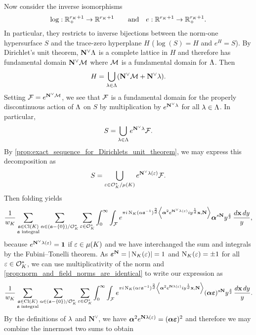       Now consider the inverse isomorphisms
      \[
        \log:\mathbb{R}_{+}^{r_{K}+1} \to \mathbb{R}^{r_{K}+1} \qquad \text{and} \quad e:\mathbb{R}^{r_{K}+1} \to \mathbb{R}_{+}^{r_{K}+1}.
      \]
      In particular, they restricts to inverse bijections between the norm-one hypersurface $S$ and the trace-zero hyperplane $H$ ($\log(S) = H$ and $e^{H} = S$). By Dirichlet's unit theorem, $\mathbf{N}^{\vee}\Lambda$ is a complete lattice in $H$ and therefore has fundamental domain $\mathbf{N}^{\vee}\mathcal{M}$ where $\mathcal{M}$ is a fundamental domain for $\Lambda$. Then
      \[
        H = \bigcup_{\lambda \in \Lambda}(\mathbf{N}^{\vee}\mathcal{M}+\mathbf{N}^{\vee}\lambda).
      \]
      Setting $\mathcal{F} = e^{\mathbf{N}^{\vee}\mathcal{M}}$, we see that $\mathcal{F}$ is a fundamental domain for the properly discontinuous action of $\Lambda$ on $S$ by multiplication by $e^{\mathbf{N}^{\vee}\lambda}$ for all $\lambda \in \Lambda$. In particular,
      \[
        S = \bigcup_{\lambda \in \Lambda}e^{\mathbf{N}^{\vee}\lambda}\mathcal{F}.
      \]
      By \cref{prop:exact_sequence_for_Dirichlets_unit_theorem}, we may express this decomposition as
      \[
        S = \bigcup_{\varepsilon \in \mathcal{O}_{K}^{\ast}/\mu(K)}e^{\mathbf{N}^{\vee}\lambda(\varepsilon)}\mathcal{F}.
      \]
      Then folding yields
      \[
        \frac{1}{w_{K}}\sum_{\substack{\mathfrak{a} \in \operatorname{\mathrm{Cl}}(K) \\ \text{$\mathfrak{a}$ integral}}}\sum_{\alpha \in (\mathfrak{a}-\{0\})/\mathcal{O}_{K}^{\ast}}\sum_{\varepsilon \in \mathcal{O}_{K}^{\ast}}\int_{0}^{\infty}\int_{\mathcal{F}}e^{\pi i\operatorname{\mathrm{N}}_{K}(\alpha\mathfrak{a}^{-1})^{\frac{2}{d}}\left\langle\boldsymbol{\alpha}^{2}e^{\mathbf{N}^{\vee}\lambda(\varepsilon)}iy^{\frac{1}{d}}\mathbf{x},\mathbf{N}\right\rangle}\boldsymbol{\alpha}^{s\mathbf{N}}y^{\frac{s}{2}}\,\frac{d\mathbf{x}\,dy}{y},
      \]
      because $e^{\mathbf{N}^{\vee}\lambda(\varepsilon)} = \mathbf{1}$ if $\varepsilon \in \mu(K)$ and we have interchanged the sum and integrals by the Fubini–Tonelli theorem. As $\boldsymbol{\varepsilon}^{\mathbf{N}} = |\operatorname{\mathrm{N}}_{K}(\varepsilon)| = 1$ and $\operatorname{\mathrm{N}}_{K}(\varepsilon) = \pm1$ for all $\varepsilon \in \mathcal{O}_{K}^{\ast}$, we can use multiplicativity of the norm and \cref{prop:norm_and_field_norms_are_identical} to write our expression as
      \[
        \frac{1}{w_{K}}\sum_{\substack{\mathfrak{a} \in \operatorname{\mathrm{Cl}}(K) \\ \text{$\mathfrak{a}$ integral}}}\sum_{\alpha \in (\mathfrak{a}-\{0\})/\mathcal{O}_{K}^{\ast}}\sum_{\varepsilon \in \mathcal{O}_{K}^{\ast}}\int_{0}^{\infty}\int_{\mathcal{F}}e^{\pi i\operatorname{\mathrm{N}}_{K}(\alpha\varepsilon\mathfrak{a}^{-1})^{\frac{2}{d}}\left\langle\boldsymbol{\alpha}^{2}e^{\mathbf{N}\lambda(\varepsilon)}iy^{\frac{1}{d}}\mathbf{x},\mathbf{N}\right\rangle}(\boldsymbol{\alpha}\boldsymbol{\varepsilon})^{s\mathbf{N}}y^{\frac{s}{2}}\,\frac{d\mathbf{x}\,dy}{y}.
      \]
      By the definitions of $\lambda$ and $\mathbf{N}^{\vee}$, we have $\boldsymbol{\alpha}^{2}e^{\mathbf{N}\lambda(\varepsilon)} = (\boldsymbol{\alpha\varepsilon})^{2}$ and therefore we may combine the innermost two sums to obtain
